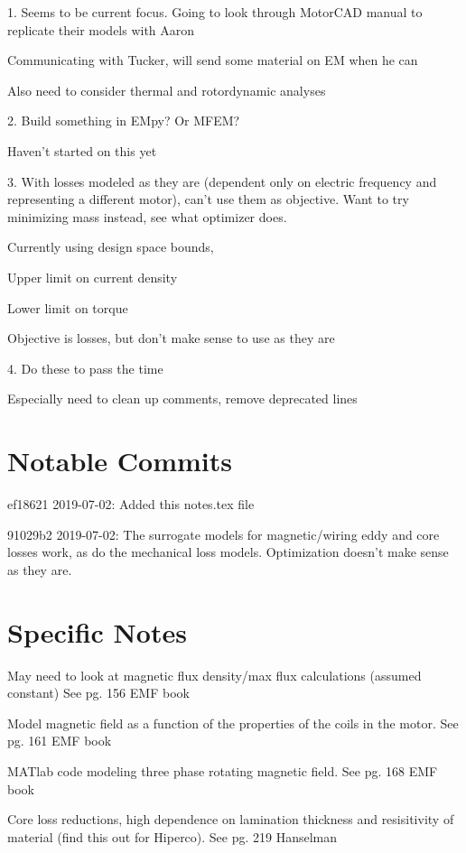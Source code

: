\documentclass[10pt]{article}
\begin{document}
1. 
Seems to be current focus.
Going to look through MotorCAD manual to replicate their models with Aaron

Communicating with Tucker, will send some material on EM when he can

Also need to consider thermal and rotordynamic analyses

2.
Build something in EMpy?
Or MFEM?

Haven't started on this yet


3.
With losses modeled as they are (dependent only on electric frequency and representing a different motor), can't use them as objective.
Want to try minimizing mass instead, see what optimizer does.

Currently using design space bounds,

Upper limit on current density 

Lower limit on torque 

Objective is losses, but don't make sense to use as they are

4. 
Do these to pass the time

Especially need to clean up comments, remove deprecated lines




\section{Notable Commits}

ef18621 2019-07-02: Added this notes.tex file

91029b2 2019-07-02: The surrogate models for magnetic/wiring eddy and core losses work, as do the mechanical loss models. Optimization doesn't make sense as they are.

\section{Specific Notes}

May need to look at magnetic flux density/max flux calculations (assumed constant) See pg. 156 EMF book

Model magnetic field as a function of the properties of the coils in the motor. See pg. 161 EMF book

MATlab code modeling three phase rotating magnetic field. See pg. 168 EMF book

Core loss reductions, high dependence on lamination thickness and resisitivity of material (find this out for Hiperco). See pg. 219 Hanselman
\end{document}
